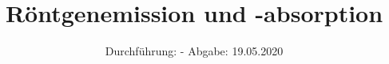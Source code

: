 

\subject{V602}
\title{Röntgenemission und -absorption}
\date{%
  Durchführung: -
  \hspace{3em}
  Abgabe: 19.05.2020
}



\maketitle
\thispagestyle{empty}
\tableofcontents
\newpage







\printbibliography{}



